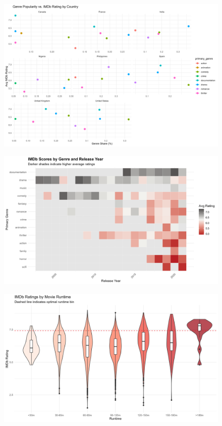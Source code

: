 \documentclass[
  man,floatsintext]{apa6}
\begin{document}
\begin{figure}

{\centering \includegraphics[width=0.9\linewidth]{../Question3/Results/genre_rating_plot} 

}

\caption{ }\label{fig:audienceengage-4}
\end{figure}
\begin{figure}

{\centering \includegraphics[width=0.9\linewidth]{../Question3/Results/genrescore} 

}

\caption{ }\label{fig:audienceengage-5}
\end{figure}
\begin{figure}

{\centering \includegraphics[width=0.9\linewidth]{../Question3/Results/IMDbratings} 

}

\caption{ }\label{fig:audienceengage-6}
\end{figure}
\end{document}
